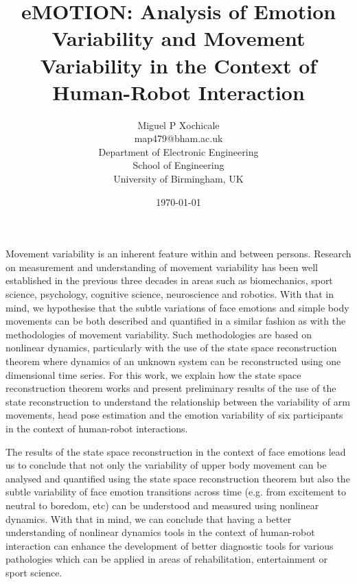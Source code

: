 \documentclass[12pt]{article}
\author{Miguel P Xochicale\\
map479@bham.ac.uk \\
Department of Electronic Engineering\\
School of Engineering\\
University of Birmingham, UK}
\title{
eMOTION: Analysis of Emotion Variability and Movement Variability in the Context of Human-Robot Interaction
}
\date{\today}
\begin{document}
\maketitle

Movement variability is an inherent feature within and between persons.
Research on measurement and understanding of movement variability has been well
established in the previous three decades in areas such as biomechanics,
sport science, psychology, cognitive science, neuroscience and robotics.
With that in mind, we hypothesise that the subtle variations of face emotions
and simple body movements can be both described and quantified in a similar 
fashion as with the methodologies of movement variability.
Such methodologies are based on nonlinear dynamics, particularly with the use of
the state space reconstruction theorem where dynamics of an unknown system
can be reconstructed using one dimensional time series.
For this work, we explain how the state space reconstruction theorem works and
present preliminary results of the use of the state reconstruction
to understand the relationship between the variability of arm movements, head
pose estimation and the emotion variability of six participants in the context of 
human-robot interactions.

The results of the state space reconstruction in the context of face emotions 
lead us to conclude that not only the variability of upper body movement 
can be analysed and quantified using the state space reconstruction theorem
but also the subtle variability of face emotion transitions across time 
(e.g. from excitement to neutral to boredom, etc)
can be understood and measured using nonlinear dynamics.
With that in mind, we can conclude that having a better understanding of 
nonlinear dynamics tools in the context of human-robot interaction 
can enhance the development of better diagnostic tools for various 
pathologies which can be applied in areas of rehabilitation, entertainment or 
sport science.
\end{document}
